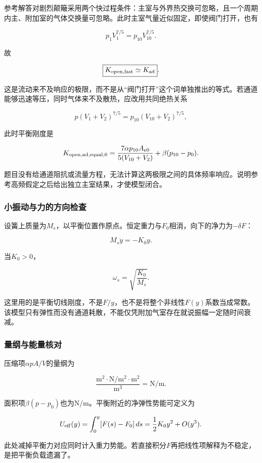\documentclass[12pt,a4paper,fontset=fandol]{ctexart}
\begin{document}
参考解答对剧烈颠簸采用两个快过程条件：主室与外界热交换可忽略，且一个周期内主、附加室的气体交换量可忽略。此时主室气量近似固定，即使阀门打开，也有

\[
p_1V_1^{7/5}=p_{10}V_{10}^{7/5}.
\]

故

\[
\boxed{K_{\rm open,fast}\simeq K_{\rm ad}}.
\]

这是流动来不及响应的极限，而不是从``阀门打开''这个词单独推出的等式。若通道能够迅速等压，同时气体来不及散热，应改用共同绝热关系

\[
p(V_1+V_2)^{7/5}
=p_{10}(V_{10}+V_2)^{7/5},
\]

此时平衡刚度是

\[
K_{{\rm open,ad,equal},0}
=\frac{7\alpha p_{10}A_{e0}}{5(V_{10}+V_2)}
+\beta(p_{10}-p_0).
\]

题目没有给通道阻抗或流量方程，无法计算这两极限之间的具体频率响应。说明参考高频假定之后给出独立主室结果，才使模型闭合。

\subsubsection{小振动与力的方向检查}\label{ux5c0fux632fux52a8ux4e0eux529bux7684ux65b9ux5411ux68c0ux67e5}

设簧上质量为\(M_s\)，以平衡位置作原点。恒定重力与\(F_0\)相消，向下的净力为\(-\delta F\)：

\[
M_s\ddot y=-K_0y.
\]

当\(K_0>0\)，

\[
\omega_s=\sqrt{\frac{K_0}{M_s}}.
\]

这里用的是平衡切线刚度，不是\(F/y\)，也不是将整个非线性\(F(y)\)系数当成常数。该模型只有弹性而没有通道耗散，不能仅凭附加气室存在就说振幅一定随时间衰减。

\subsubsection{量纲与能量核对}\label{ux91cfux7eb2ux4e0eux80fdux91cfux6838ux5bf9}

压缩项\(\alpha pA/V\)的量纲为

\[
\frac{\mathrm{m^2}\cdot\mathrm{N/m^2}\cdot\mathrm{m^2}}
{\mathrm{m^3}}=\mathrm{N/m}.
\]

面积项\(\beta(p-p_0)\)也为N/m。平衡附近的净弹性势能可定义为

\[
U_{\rm eff}(y)=\int_0^y[F(s)-F_0]\,ds
=\frac12K_0y^2+O(y^3).
\]

此处减掉平衡力对应同时计入重力势能。若直接积分\(F\)再把线性项解释为不稳定，是把平衡负载遗漏了。
\end{document}
